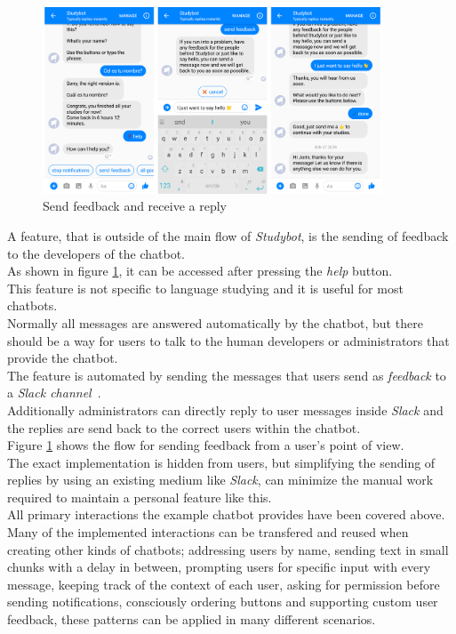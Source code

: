 \begin{figure}[h]
  \centering
  \includegraphics[width=0.9\textwidth]{images/interface/09-feedback.png}
	\caption{Send feedback and receive a reply}
	\label{fig:09-feedback}
\end{figure}

\label{slackhook}

A feature, that is outside of the main flow of \emph{Studybot}, is the sending of feedback to the developers of the chatbot.
\\
As shown in figure \ref{fig:09-feedback}, it can be accessed after pressing the \emph{help} button.
\\
This feature is not specific to language studying and it is useful for most chatbots.
\\
Normally all messages are answered automatically by the chatbot,
but there should be a way for users to talk to the human developers or administrators that provide the chatbot.
\\
The feature is automated by sending the messages that users send as \emph{feedback}
to a \emph{Slack channel}~\cite{slack}.
\\
Additionally administrators can directly reply to user messages inside \emph{Slack}
and the replies are send back to the correct users within the chatbot.
\\
Figure \ref{fig:09-feedback} shows the flow for sending feedback from a user's point of view.
\\
The exact implementation is hidden from users,
but simplifying the sending of replies by using an existing medium like \emph{Slack},
can minimize the manual work required to maintain a personal feature like this.
\\


All primary interactions the example chatbot provides have been covered above.
\\
Many of the implemented interactions can be transfered and reused when creating other kinds of chatbots;
addressing users by name,
sending text in small chunks with a delay in between,
prompting users for specific input with every message,
keeping track of the context of each user,
asking for permission before sending notifications,
consciously ordering buttons and
supporting custom user feedback,
these patterns can be applied in many different scenarios.
\\

